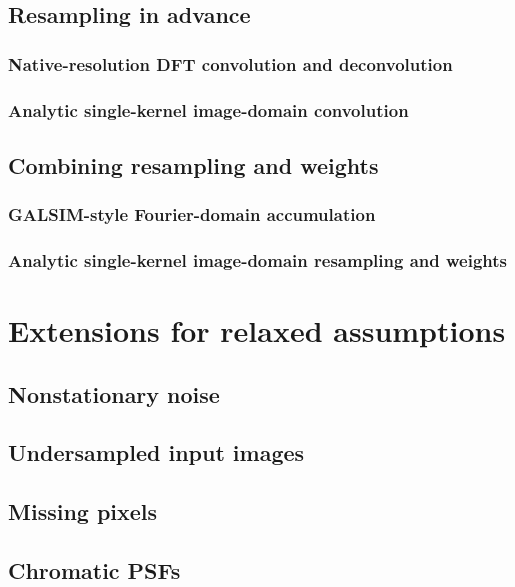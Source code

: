 \documentclass[DM,authoryear,toc]{lsstdoc}
\begin{document}
\label{sec:implementation-options}

\subsection{Resampling in advance}

\subsubsection{Native-resolution DFT convolution and deconvolution}

\subsubsection{Analytic single-kernel image-domain convolution}

\subsection{Combining resampling and weights}

\subsubsection{GALSIM-style Fourier-domain accumulation}

\subsubsection{Analytic single-kernel image-domain resampling and weights}

\section{Extensions for relaxed assumptions}

\subsection{Nonstationary noise}

\subsection{Undersampled input images}

\subsection{Missing pixels}

\subsection{Chromatic PSFs}
\end{document}
